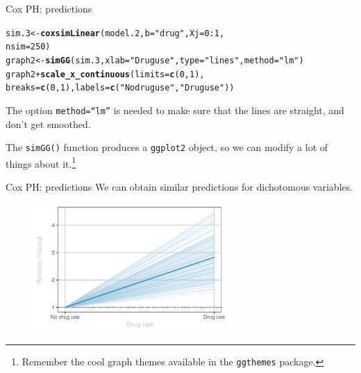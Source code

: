 \documentclass[12pt,english,pdf,xcolor=dvipsnames,aspectratio=169,handout]{beamer}\usepackage[]{graphicx}\usepackage[]{xcolor}
\makeatletter
\newcommand{\hlnum}[1]{\textcolor[rgb]{0.686,0.059,0.569}{#1}}%
\newcommand{\hlstr}[1]{\textcolor[rgb]{0.192,0.494,0.8}{#1}}%
\newcommand{\hlopt}[1]{\textcolor[rgb]{0,0,0}{#1}}%
\newcommand{\hlstd}[1]{\textcolor[rgb]{0.345,0.345,0.345}{#1}}%
\newcommand{\hlkwb}[1]{\textcolor[rgb]{0.69,0.353,0.396}{#1}}%
\newcommand{\hlkwc}[1]{\textcolor[rgb]{0.333,0.667,0.333}{#1}}%
\newcommand{\hlkwd}[1]{\textcolor[rgb]{0.737,0.353,0.396}{\textbf{#1}}}%
\newenvironment{kframe}{%
 \def\at@end@of@kframe{}%
 \ifinner\ifhmode%
  \def\at@end@of@kframe{\end{minipage}}%
  \begin{minipage}{\columnwidth}%
 \fi\fi%
 \def\FrameCommand##1{\hskip\@totalleftmargin \hskip-\fboxsep
 \colorbox{shadecolor}{##1}\hskip-\fboxsep
     \hskip-\linewidth \hskip-\@totalleftmargin \hskip\columnwidth}%
 \MakeFramed {\advance\hsize-\width
   \@totalleftmargin\z@ \linewidth\hsize
   \@setminipage}}%
 {\par\unskip\endMakeFramed%
 \at@end@of@kframe}
\newenvironment{knitrout}{}{} %
\makeatother
\begin{document}
\begin{frame}[fragile]{Cox PH: predictions}

\begin{knitrout}\scriptsize
{}\color{fgcolor}\begin{kframe}
\begin{alltt}
\hlstd{sim.3} \hlkwb{<-} \hlkwd{coxsimLinear}\hlstd{(model.2,} \hlkwc{b} \hlstd{=} \hlstr{"drug"}\hlstd{,} \hlkwc{Xj} \hlstd{=} \hlnum{0}\hlopt{:}\hlnum{1}\hlstd{,}
                      \hlkwc{nsim} \hlstd{=} \hlnum{250}\hlstd{)}
\hlstd{graph2} \hlkwb{<-} \hlkwd{simGG}\hlstd{(sim.3,} \hlkwc{xlab} \hlstd{=} \hlstr{"Drug use"}\hlstd{,} \hlkwc{type} \hlstd{=} \hlstr{"lines"}\hlstd{,} \hlkwc{method} \hlstd{=} \hlstr{"lm"}\hlstd{)}
\hlstd{graph2} \hlopt{+} \hlkwd{scale_x_continuous}\hlstd{(}\hlkwc{limits} \hlstd{=} \hlkwd{c}\hlstd{(}\hlnum{0}\hlstd{,} \hlnum{1}\hlstd{),}
    \hlkwc{breaks} \hlstd{=} \hlkwd{c}\hlstd{(}\hlnum{0}\hlstd{,} \hlnum{1}\hlstd{),} \hlkwc{labels} \hlstd{=} \hlkwd{c}\hlstd{(}\hlstr{"No drug use"}\hlstd{,} \hlstr{"Drug use"}\hlstd{))}
\end{alltt}
\end{kframe}
\end{knitrout}



The option \texttt{method=``lm''} is needed to make sure that the lines are straight, and don't get smoothed.\bigskip

The \texttt{simGG()} function produces a \texttt{ggplot2} object, so we can modify a lot of things about it.\footnote{Remember the cool graph themes available in the \texttt{ggthemes} package.}

\end{frame}



\begin{frame}[fragile]{Cox PH: predictions}
We can obtain similar predictions for dichotomous variables.\bigskip

\begin{figure}
\centering
\includegraphics[width=0.65\textwidth]{../03-graphs/02-04}
\end{figure}
\end{frame}
\end{document}
